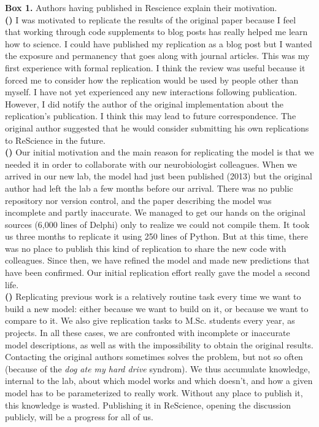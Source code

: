 \documentclass[a4paper,10pt, twocolumn]{article}
\begin{document}
\begin{tcolorbox}[breakable, pad at break*=1mm,
                  colback=black!2.5, arc=0pt, outer arc=0pt, boxrule=0pt]
\begin{footnotesize}
\textbf{Box 1.} Authors having  published in Rescience explain their motivation.\\

\textbf{(\cite{stachelek:2016})} I was motivated to replicate the results of
the original paper because I feel that working through code supplements to blog
posts has really helped me learn how to science. I could have published my
replication as a blog post but I wanted the exposure and permanency that goes
along with journal articles. This was my first experience with formal
replication. I think the review was useful because it forced me to consider how
the replication would be used by people other than myself. I have not yet
experienced any new interactions following publication. However, I did notify
the author of the original implementation about the replication's
publication. I think this may lead to future correspondence. The original
author suggested that he would consider submitting his own replications to
ReScience in the future.\\

\textbf{(\cite{topalidou:2015b})} Our initial motivation and the main reason
for replicating the model is that we needed it in order to collaborate with our
neurobiologist colleagues. When we arrived in our new lab, the model had just
been published (2013) but the original author had left the lab a few months before
our arrival. There was no public repository nor version control, and the paper
describing the model was incomplete and partly inaccurate. We managed to get
our hands on the original sources (6,000 lines of Delphi) only to realize we
could not compile them. It took us three months to replicate it using 250 lines
of Python. But at this time, there was no place to publish this kind of
replication to share the new code with colleagues. Since then, we have refined
the model and made new predictions that have been confirmed. Our initial
replication effort really gave the model a second life.\\

\textbf{(\cite{viejo:2016})} Replicating previous work is a relatively routine
task every time we want to build a new model: either because we want to build
on it, or because we want to compare to it. We also give replication tasks to
M.Sc. students every year, as projects. In all these cases, we are confronted
with incomplete or inaccurate model descriptions, as well as with the impossibility
to obtain the original results. Contacting the original authors sometimes
solves the problem, but not so often (because of the {\em dog ate my hard
  drive} syndrom). We thus accumulate knowledge, internal to the lab, about
which model works and which doesn't, and how a given model has to be parameterized
to really work. Without any place to publish it, this knowledge is
wasted. Publishing it in ReScience, opening the discussion publicly, will be a
progress for all of us. \par
\end{footnotesize}
\end{tcolorbox}
\end{document}
